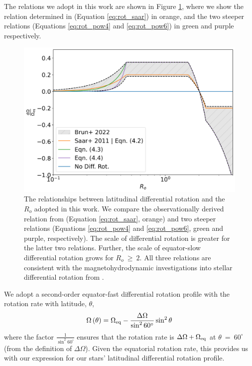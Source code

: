 The relations we adopt in this work are shown in Figure \ref{fig:compar_diffrot}, where we show the relation determined in \citet{saar_starspots_2011} (Equation \ref{eq:rot_saar}) in orange, and the two steeper relations (Equations \ref{eq:rot_pow4} and \ref{eq:rot_pow6}) in green and purple respectively.

\begin{figure}
\centering
 \includegraphics[width=\textwidth]{Figures/rot_gap_figures/comparison_diffrot.png}
 \caption[The relationships between latitudinal differential rotation and the stellar $R_o$ adopted in this work.]{
 	The relationships between latitudinal differential rotation and the $R_o$ adopted in this work. We compare the observationally derived relation from \citet{saar_starspots_2011} (Equation \ref{eq:rot_saar}, orange) and two steeper relations (Equations \ref{eq:rot_pow4} and \ref{eq:rot_pow6}, green and purple, respectively). The scale of differential rotation is greater for the latter two relations. Further, the scale of equator-slow differential rotation grows for $R_o\ \geq \ 2$. All three relations are consistent with the magnetohydrodynamic investigations into stellar differential rotation from \citet{brun_powering_2022}.
}
 \label{fig:compar_diffrot}
\end{figure}

We adopt a second-order equator-fast differential rotation profile with the rotation rate with latitude, $\theta$,
\begin{equation}
 \label{eq:obs_eq}
 \Omega\left(\theta\right) = \Omega_{\rm{eq}} - \frac{\Delta \Omega}{\sin^2 60^{\circ}} \sin^2{\theta}
\end{equation}
where the factor $\frac{1}{\sin^2{60^{\circ}}}$ ensures that the rotation rate is $\Delta \Omega + \Omega_{\rm{eq}}$ at $\theta \ = \ 60^{\circ}$ (from the definition of $\Delta \Omega$).
Given the equatorial rotation rate, this provides us with our expression for our stars' latitudinal differential rotation profile.


